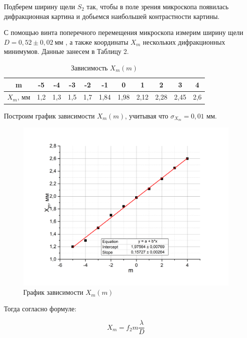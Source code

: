 \documentclass[a4paper,12pt]{article}
\begin{document}
Подберем ширину щели $S_2$ так, чтобы в поле зрения микроскопа появилась дифракционная картина и добьемся наибольшей контрастности картины.

С помощью винта поперечного перемещения микроскопа измерим ширину щели $D = 0,52 \pm 0,02 \ мм$ , а также координаты $X_m$ нескольких дифракционных минимумов. Данные занесем в Таблицу 2.

\begin{table}[h]
\begin{center}
\caption{Зависимость $X_m(m)$}
\begin{tabular}{|c|c|c|c|c|c|c|c|c|c|c|}
\hline
m     & -5  & -4  & -3  & -2  & -1   & 0    & 1    & 2    & 3    & 4   \\ \hline
$X_m$, мм & 1,2 & 1,3 & 1,5 & 1,7 & 1,84 & 1,98 & 2,12 & 2,28 & 2,45 & 2,6 \\ \hline
\end{tabular}
\end{center}
\end{table}

Построим график зависимости $X_m(m)$, учитывая что $\sigma_{X_m} = 0,01 $ мм.

\begin{figure}[h!]
	\begin{center}
    		\includegraphics[scale = 0.4]{graph2}
    		\caption{График зависимости $X_m(m)$}
	\end{center}
\end{figure}

Тогда согласно формуле:

$$
X_m = f_2 m \frac{\lambda}{D}
$$
\end{document}
